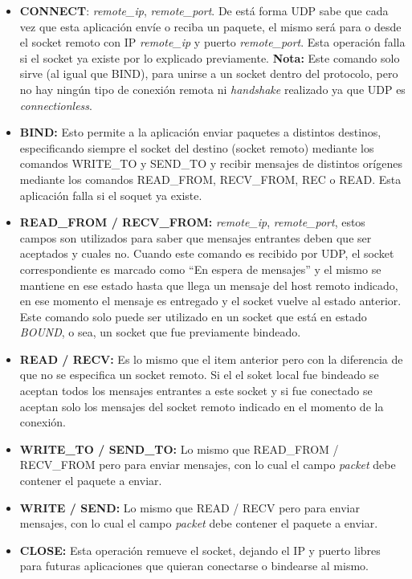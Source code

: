 \documentclass[10pt,a4paper]{article}
\begin{document}
\begin{itemize}
\item \textbf{CONNECT}: \textit{remote\_ip}, \textit{remote\_port}. De está forma UDP sabe que cada vez que esta aplicación envíe o reciba un paquete, el mismo será para o desde el socket remoto con IP \textit{remote\_ip} y puerto \textit{remote\_port}. Esta operación falla si el socket ya existe por lo explicado previamente. \textbf{Nota:} Este comando solo sirve (al igual que BIND), para unirse a un socket dentro del protocolo, pero no hay ningún tipo de conexión remota ni \textit{handshake} realizado ya que UDP es \textit{connectionless}.
\item \textbf{BIND:} Esto permite a la aplicación enviar paquetes a distintos destinos, especificando siempre el socket del destino (socket remoto) mediante los comandos WRITE\_TO y SEND\_TO y recibir mensajes de distintos orígenes mediante los comandos READ\_FROM, RECV\_FROM, REC o READ. Esta aplicación falla si el soquet ya existe.
\item \textbf{READ\_FROM / RECV\_FROM:} \textit{remote\_ip}, \textit{remote\_port}, estos campos son utilizados para saber que mensajes entrantes deben que ser aceptados y cuales no. Cuando este comando es recibido por UDP, el socket correspondiente es marcado como ``En espera de mensajes'' y el mismo se mantiene en ese estado hasta que llega un mensaje del host remoto indicado, en ese momento el mensaje es entregado y el socket vuelve al estado anterior. Este comando solo puede ser utilizado en un socket que está en estado \textit{BOUND}, o sea, un socket que fue previamente bindeado.
\item \textbf{READ / RECV:} Es lo mismo que el item anterior pero con la diferencia de que no se especifica un socket remoto. Si el el soket local fue bindeado se aceptan todos los mensajes entrantes a este socket y si fue conectado se aceptan solo los mensajes del socket remoto indicado en el momento de la conexión.
\item \textbf{WRITE\_TO / SEND\_TO:} Lo mismo que READ\_FROM / RECV\_FROM pero para enviar mensajes, con lo cual el campo \textit{packet} debe contener el paquete a enviar.
\item \textbf{WRITE / SEND:} Lo mismo que READ / RECV pero para enviar mensajes, con lo cual el campo \textit{packet} debe contener el paquete a enviar.
\item \textbf{CLOSE:} Esta operación remueve el socket, dejando el IP y puerto libres para futuras aplicaciones que quieran conectarse o bindearse al mismo.
\end{itemize}
\end{document}
